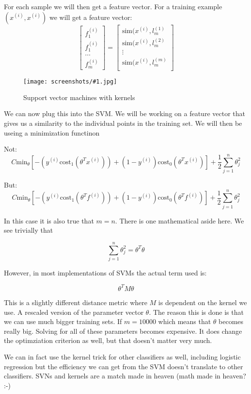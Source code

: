\documentclass[a4, 12pt, english, USenglish]{scrreprt}
\newcommand{\screenshot}[2]{
\begin{figure}[htb]
\texttt{[image: screenshots/\#1.jpg]}
\label{#1}
\caption{#2}
\end{figure}}
\newcommand{\brackets}[1]{\ensuremath{\left[{#1}\right]}}
\begin{document}
For each sample we will then get a feature vector.  For a training
example \((x^{(i)},x^{(i)})\)  we will get a feature vector:
\[
\brackets{
\begin{array}{l}
f_1^{(i)}\\f_1^{(i)}\\\ldots\\f_m^{(i)}
\end{array} 
} =
\brackets{
\begin{array}{l}
\mbox{sim}(x^{(i)}, l_m^{(1)}\\
\mbox{sim}(x^{(i)}, l_m^{(2)}\\
\vdots \\
\mbox{sim}(x^{(i)}, l_m^{(m)}\\
\end{array} 
}
\]

\screenshot{svmwithkernels}{Support vector machines with kernels}

We can now plug this into the SVM.  We will be working on a feature
vector that gives us a  similarity to the individual points in the
training set.  We will then be useing a minimization functinon

Not:
\[
  C \mbox{min}_\theta \brackets{
 -(y^{(i)}\mbox{cost}_1(\theta^Tx^{(i)})) + (1 - y^{(i)} ) \mbox{cost}_0(\theta^Tx^{(i)})}
+ \frac{1}{2} \sum_{j=1}^n \theta_j^2
\]

But:
\[
  C \mbox{min}_\theta \brackets{
 -(y^{(i)}\mbox{cost}_1(\theta^Tf^{(i)})) + (1 - y^{(i)} ) \mbox{cost}_0(\theta^Tf^{(i)})}
+ \frac{1}{2} \sum_{j=1}^n \theta_j^2
\]

In this case it is also true that \(m=n\).     There is one
mathematical aside here.  We see trivially that

\[
 \sum_{j=1}^n \theta_j^2 = \theta^T\theta
\]

However, in most implementations of SVMs the actual term used is:

\[
\theta^T M \theta
\]

This is a slightly different distance metric where \(M\) is dependent
on the kernel we use.   A rescaled version of the parameter vector
\(\theta\).  The reason this is done is that we can use much bigger
training sets.   If \(m=10000\) which means that \(\theta\) becomes
really big.  Solving for all of these parameters becomes expensive.
It does change the optimziation criterion as well, but that doesn't
matter very much.

We can in fact use the kernel trick for other classifiers as well,
including logistic regression but the efficiency we can get from the
SVM doesn't translate to other classifiers.   SVNs and kernels are a
match made in heaven (math made in heaven? :-)
\end{document}

